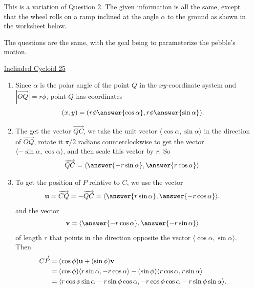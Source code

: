\documentclass{ximera}
\begin{document}
\begin{question} \label{Qevcefr3r430}
This is a variation of Question 2. The given information is all the same, except that the wheel rolls on a ramp inclined at the angle $\alpha$ to the ground as shown in the worksheet below.

The questions are the same, with the goal being to parameterize the pebble's motion.


\begin{onlineOnly}
    \begin{center}
\end{center}
\end{onlineOnly}

\href{https://www.desmos.com/calculator/bbfxfk47vu}{Inclinded Cycloid 25}



\begin{explanation}
\begin{enumerate}
We'll work in general with a circle of radius $r$ meters and a speed of $v$ meters/sec for the axle.

\item Since $\alpha$ is the polar angle of the point $Q$ in the $xy$-coordinate system and $|\overrightarrow{OQ}| = r\phi$, point $Q$ has coordinates
\[
   (x,y) = (r\phi \answer{\cos\alpha} , r\phi \answer{\sin\alpha}).
\]

\item The get the vector $\overrightarrow{QC}$, we take the unit vector $\langle \cos\alpha, \sin \alpha \rangle$ in the direction of $\overrightarrow{OQ}$, rotate it $\pi/2$ radians counterclockwise to get the vector $\langle -\sin \alpha, \cos \alpha \rangle$, and then scale this vector by $r$. So
\[
   \overrightarrow{QC} = \langle \answer{-r \sin\alpha} , \answer{r\cos\alpha}  \rangle .
\]

\item To get the position of $P$ relative to $C$, we use the vector
\[
  {\bf u} = \overrightarrow{CQ} = - \overrightarrow{QC} = \langle  \answer{r \sin\alpha} , \answer{-r\cos\alpha}  \rangle .
\]
and the vector
\[
 {\bf v} = \langle  \answer{-r \cos\alpha} , \answer{-r\sin\alpha}  \rangle 
\]
of length $r$ that points in the direction opposite the vector $\langle \cos\alpha , \sin\alpha \rangle$. Then
\begin{align*}
 \overrightarrow{CP} &= (\cos \phi) {\bf u} + (\sin\phi) {\bf v} \\
                               &= (\cos \phi)  \langle  r \sin\alpha , -r\cos\alpha \rangle - (\sin\phi)\langle r\cos\alpha, r\sin\alpha \rangle \\
                               &= \langle r \cos\phi \sin \alpha - r\sin \phi \cos\alpha , -r\cos\phi\cos\alpha - r \sin\phi \sin\alpha \rangle .
\end{align*}



\end{enumerate}
\end{explanation}
\end{question}
\end{document}
